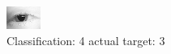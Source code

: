 \begin{figure}[h!]
\begin{center}
\includegraphics[width=0.60\columnwidth]{figures/ID72_class_4_target_3.png}
\end{center}
\caption{ Classification: 4 actual target: 3}
\label{fig:ID72_class_4_target_3}
\end{figure}
